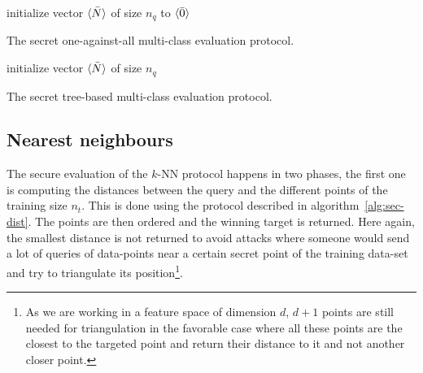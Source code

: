 \begin{center}
\begin{algorithm}[H]
\DontPrintSemicolon
initialize vector $\langle \bar{N} \rangle$ of size $n_q$ to $\langle \bar{0} \rangle$ \;
\caption{The secret one-against-all multi-class evaluation protocol.}
\label{alg:sec-multi1}
\end{algorithm}
\end{center}

\begin{center}
\begin{algorithm}[H]
\DontPrintSemicolon
initialize vector $\langle \bar{N} \rangle$ of size $n_q$ \;
\caption{The secret tree-based multi-class evaluation protocol.}
\label{alg:sec-multi2}
\end{algorithm}
\end{center}


\subsection{Nearest neighbours}
The secure evaluation of the $k$-NN protocol happens in two phases, the first one is computing the distances between the query and the different points of the training size $n_t$. This is done using the protocol described in algorithm~\ref{alg:sec-dist}. The points are then ordered and the winning target is returned. Here again, the smallest distance is not returned to avoid attacks where someone would send a lot of queries of data-points near a certain secret point of the training data-set and try to triangulate its position\footnote{As we are working in a feature space of dimension $d$, $d+1$ points are still needed for triangulation in the favorable case where all these points are the closest to the targeted point and return their distance to it and not another closer point.}.


